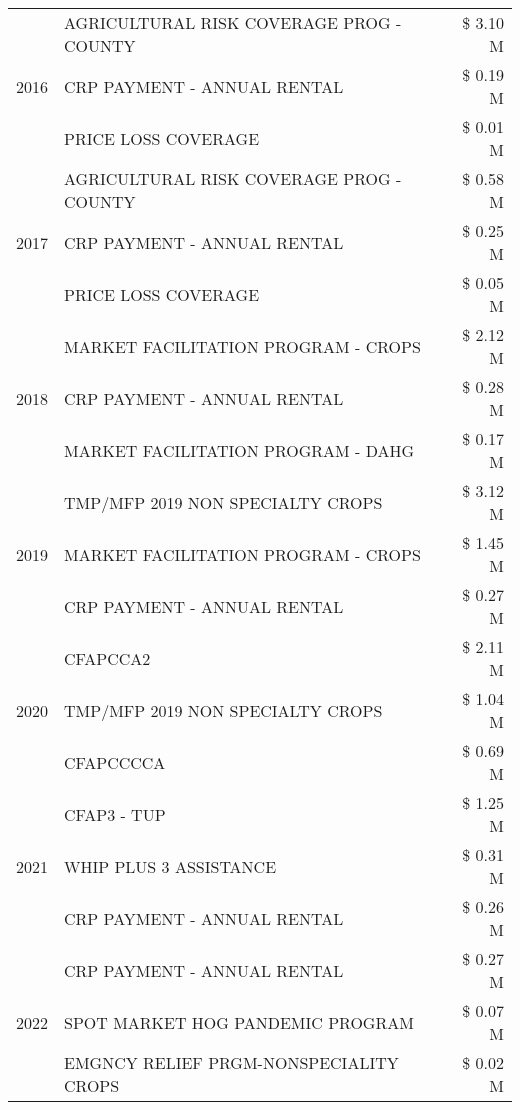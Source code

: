 \begin{tabular}{llr}
\multirow[t]{3}{*}{2016} & AGRICULTURAL RISK COVERAGE PROG - COUNTY & \$ 3.10 M \\
 & CRP PAYMENT - ANNUAL RENTAL & \$ 0.19 M \\
 & PRICE LOSS COVERAGE & \$ 0.01 M \\
\cline{1-3}
\multirow[t]{3}{*}{2017} & AGRICULTURAL RISK COVERAGE PROG - COUNTY & \$ 0.58 M \\
 & CRP PAYMENT - ANNUAL RENTAL & \$ 0.25 M \\
 & PRICE LOSS COVERAGE & \$ 0.05 M \\
\cline{1-3}
\multirow[t]{3}{*}{2018} & MARKET FACILITATION PROGRAM - CROPS & \$ 2.12 M \\
 & CRP PAYMENT - ANNUAL RENTAL & \$ 0.28 M \\
 & MARKET FACILITATION PROGRAM - DAHG & \$ 0.17 M \\
\cline{1-3}
\multirow[t]{3}{*}{2019} & TMP/MFP 2019 NON SPECIALTY CROPS & \$ 3.12 M \\
 & MARKET FACILITATION PROGRAM - CROPS & \$ 1.45 M \\
 & CRP PAYMENT - ANNUAL RENTAL & \$ 0.27 M \\
\cline{1-3}
\multirow[t]{3}{*}{2020} & CFAPCCA2 & \$ 2.11 M \\
 & TMP/MFP 2019 NON SPECIALTY CROPS & \$ 1.04 M \\
 & CFAPCCCCA & \$ 0.69 M \\
\cline{1-3}
\multirow[t]{3}{*}{2021} & CFAP3 - TUP & \$ 1.25 M \\
 & WHIP PLUS 3 ASSISTANCE & \$ 0.31 M \\
 & CRP PAYMENT - ANNUAL RENTAL & \$ 0.26 M \\
\cline{1-3}
\multirow[t]{3}{*}{2022} & CRP PAYMENT - ANNUAL RENTAL & \$ 0.27 M \\
 & SPOT MARKET HOG PANDEMIC PROGRAM & \$ 0.07 M \\
 & EMGNCY RELIEF PRGM-NONSPECIALITY CROPS & \$ 0.02 M \\
\cline{1-3}
\bottomrule
\end{tabular}
